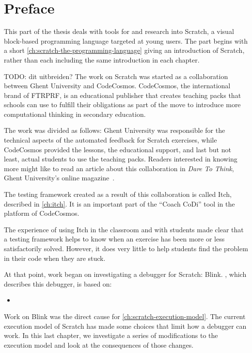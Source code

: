 \documentclass[./main]{subfiles}
\begin{document}
\chapter*{Preface}

This part of the thesis deals with tools for and research into Scratch, a visual block-based programming language targeted at young users.
The part begins with a short \cref{ch:scratch-the-programming-language} giving an introduction of Scratch, rather than each including the same introduction in each chapter.

TODO: dit uitbreiden?
The work on Scratch was started as a collaboration between Ghent University and CodeCosmos.
CodeCosmos, the international brand of FTRPRF, is an educational publisher that creates teaching packs that schools can use to fulfill their obligations as part of the move to introduce more computational thinking in secondary education.

The work was divided as follows: Ghent University was responsible for the technical aspects of the automated feedback for Scratch exercises, while CodeCosmos provided the lessons, the educational support, and last but not least, actual students to use the teaching packs.
Readers interested in knowing more might like to read an article about this collaboration in \textit{Dare To Think}, Ghent University's online magazine~\autocite{daretothinkCoachCoDiMotivationboosting2023}.

The testing framework created as a result of this collaboration is called Itch, described in \cref{ch:itch}.
It is an important part of the ``Coach CoDi'' tool in the platform of CodeCosmos.

The experience of using Itch in the classroom and with students made clear that a testing framework helps to know when an exercise has been more or less satisfactorily solved.
However, it does very little to help students find the problem in their code when they are stuck.

At that point, work began on investigating a debugger for Scratch: Blink.
, which describes this debugger, is based on:

\begin{itemize}
    \item {}
\end{itemize}

Work on Blink was the direct cause for \cref{ch:scratch-execution-model}.
The current execution model of Scratch has made some choices that limit how a debugger can work.
In this last chapter, we investigate a series of modifications to the execution model and look at the consequences of those changes.
\end{document}

